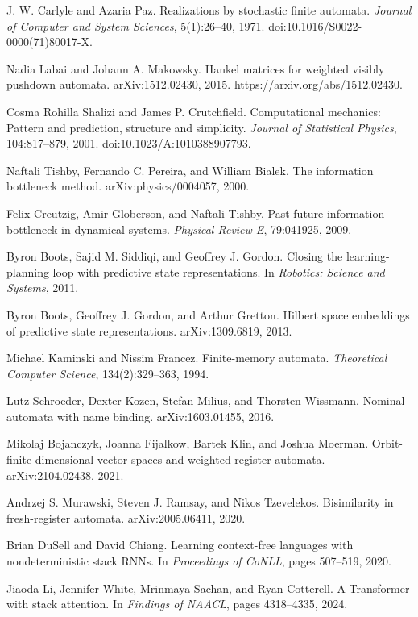 \documentclass[11pt]{article}
\begin{document}
J. W. Carlyle and Azaria Paz. Realizations by stochastic finite automata. \emph{Journal of Computer and System Sciences}, 5(1):26--40, 1971. doi:10.1016/S0022-0000(71)80017-X.

Nadia Labai and Johann A. Makowsky. Hankel matrices for weighted visibly pushdown automata. arXiv:1512.02430, 2015. \url{https://arxiv.org/abs/1512.02430}.

Cosma Rohilla Shalizi and James P. Crutchfield. Computational mechanics: Pattern and prediction, structure and simplicity. \emph{Journal of Statistical Physics}, 104:817--879, 2001. doi:10.1023/A:1010388907793.

Naftali Tishby, Fernando C. Pereira, and William Bialek. The information bottleneck method. arXiv:physics/0004057, 2000.

Felix Creutzig, Amir Globerson, and Naftali Tishby. Past-future information bottleneck in dynamical systems. \emph{Physical Review E}, 79:041925, 2009.

Byron Boots, Sajid M. Siddiqi, and Geoffrey J. Gordon. Closing the learning-planning loop with predictive state representations. In \emph{Robotics: Science and Systems}, 2011.

Byron Boots, Geoffrey J. Gordon, and Arthur Gretton. Hilbert space embeddings of predictive state representations. arXiv:1309.6819, 2013.

Michael Kaminski and Nissim Francez. Finite-memory automata. \emph{Theoretical Computer Science}, 134(2):329--363, 1994.

Lutz Schroeder, Dexter Kozen, Stefan Milius, and Thorsten Wissmann. Nominal automata with name binding. arXiv:1603.01455, 2016.

Mikolaj Bojanczyk, Joanna Fijalkow, Bartek Klin, and Joshua Moerman. Orbit-finite-dimensional vector spaces and weighted register automata. arXiv:2104.02438, 2021.

Andrzej S. Murawski, Steven J. Ramsay, and Nikos Tzevelekos. Bisimilarity in fresh-register automata. arXiv:2005.06411, 2020.

Brian DuSell and David Chiang. Learning context-free languages with nondeterministic stack RNNs. In \emph{Proceedings of CoNLL}, pages 507--519, 2020.

Jiaoda Li, Jennifer White, Mrinmaya Sachan, and Ryan Cotterell. A Transformer with stack attention. In \emph{Findings of NAACL}, pages 4318--4335, 2024.
\end{document}
